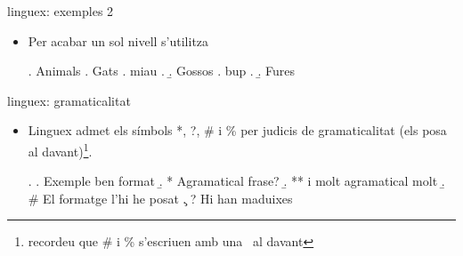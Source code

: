 \begin{frame}[fragile]{linguex: exemples 2}
\begin{itemize}
\item Per acabar un sol nivell s'utilitza 
\begin{exampletwouptiny2}
\ex. Animals
\a. Gats
\a. miau
\z.
\b. Gossos
\a. bup
\z.
\b. Fures

\end{exampletwouptiny2}
\end{itemize}

\end{frame}

\begin{frame}[fragile]{linguex: gramaticalitat}
\begin{itemize}
    \item Linguex admet els símbols *, ?, \# i \% per judicis de gramaticalitat (els posa al davant)\footnote{recordeu que \# i \% s'escriuen amb una \bs~al davant}.
\begin{exampletwouptiny2}
\ex.
\a. Exemple ben format
\b. * Agramatical frase?
\b. ** i molt agramatical molt
\b. \# El formatge l'hi he posat
\c. ? Hi han maduixes

\end{exampletwouptiny2}
\end{itemize}

\end{frame}

